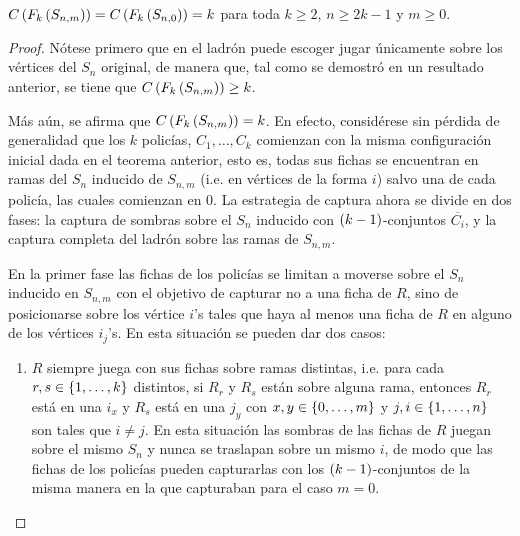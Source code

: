 \begin{teorema}
\label{teo:numero-de-policia-estrella-subdivisiones}
    $C\left( F_k\left( S_{n,m}\right)\right)=C\left( F_k\left( S_{n,0}\right)\right)=k$ para toda $k\geq 2$, $n\geq
    2k-1$ y $m\geq 0$.
\end{teorema}
\begin{proof}
    N\'otese primero que en  el ladr\'on puede escoger jugar \'unicamente sobre
    los v\'ertices del $S_n$ original, de manera que, tal como se demostr\'o en
    un resultado anterior, se tiene que $C\left( F_k\left( S_{n,m}\right)\right)\geq k$.

    M\'as a\'un, se afirma que $C\left( F_k\left( S_{n,m}\right)\right)=k$. En efecto, consid\'erese
    sin p\'erdida de generalidad que los $k$ polic\'ias, $C_1,\dots, C_k$
    comienzan con la misma configuraci\'on inicial dada en el teorema anterior,
    esto es, todas sus fichas se encuentran en ramas del $S_n$ inducido de
    $S_{n,m}$ (i.e. en v\'ertices de la forma $i$) salvo una de cada polic\'ia,
    las cuales comienzan en $0$. La estrategia de captura ahora se divide en dos
    fases: la captura de sombras sobre el $S_n$ inducido con $\left( k-1\right)$-conjuntos
    $\overline{C_i}$, y la captura completa del ladr\'on sobre las ramas de
    $S_{n,m}$.

    En la primer fase las fichas de los polic\'ias se limitan a moverse sobre el
    $S_n$ inducido en $S_{n,m}$ con el objetivo de capturar no a una ficha de
    $R$, sino de posicionarse sobre los v\'ertice $i$'s tales que haya al menos
    una ficha de $R$ en alguno de los v\'ertices $i_j$'s. En esta situaci\'on se
    pueden dar dos casos:
        \begin{enumerate}
            \item $R$ siempre juega con sus fichas sobre ramas distintas, i.e.
            para cada $r,s\in \{1,\dots, k\}$ distintos, si $R_r$ y $R_s$ est\'an
            sobre alguna rama, entonces $R_r$ est\'a en una $i_{x}$ y $R_s$
            est\'a en una $j_{y}$ con $x,y\in \{0,\dots, m\}$ y $j,i\in \{1,\dots, n\}$
            son tales que $i\neq j$. En esta situaci\'on las sombras de las
            fichas de $R$ juegan sobre el mismo $S_n$ y nunca se traslapan sobre
            un mismo $i$, de modo que las fichas de los polic\'ias pueden
            capturarlas con los $\left( k-1\right)$-conjuntos de la misma manera en la que
            capturaban para el caso $m=0$.
            

\end{enumerate}
\end{proof}
